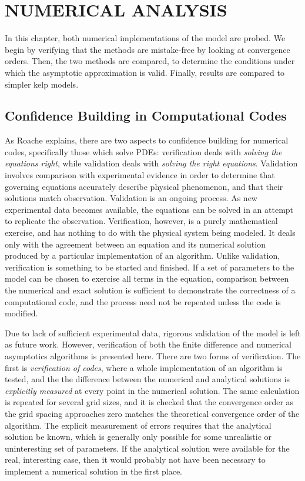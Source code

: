 \chapter{NUMERICAL ANALYSIS}
\label{chap:model_analysis}

In this chapter, both numerical implementations of the model are probed.
We begin by verifying that the methods are mistake-free by looking at convergence orders.
Then, the two methods are compared, to determine the conditions under which the asymptotic
approximation is valid.
Finally, results are compared to simpler kelp models.

\section{Confidence Building in Computational Codes}
As Roache explains, there are two aspects to confidence building for numerical codes, specifically those which solve PDEs:
verification deals with \textit{solving the equations right}, while validation deals with \textit{solving the right equations}.
Validation involves comparison with experimental evidence in order to determine that governing equations
accurately describe physical phenomenon, and that their solutions match observation.
Validation is an ongoing process.
As new experimental data becomes available, the equations can be solved in an attempt to replicate the observation.
Verification, however, is a purely mathematical exercise, and has nothing to do with the physical system being modeled.
It deals only with the agreement between an equation and its numerical solution produced by a particular implementation of an algorithm.
Unlike validation, verification is something to be started and finished.
If a set of parameters to the model can be chosen to exercise all terms in the equation, comparison between the numerical and exact solution is sufficient to demonstrate the correctness of a computational code, and the process need not be repeated unless the code is modified.

Due to lack of sufficient experimental data, rigorous validation of the model is left as future work.
However, verification of both the finite difference and numerical asymptotics algorithms is presented here.
There are two forms of verification.
The first is \textit{verification of codes}, where a whole implementation of an algorithm is tested, and the the difference between the numerical and analytical solutions is \textit{explicitly measured} at every point in the numerical solution.
The same calculation is repeated for several grid sizes, and it is checked that the convergence order as the grid spacing approaches zero matches the theoretical convergence order of the algorithm.
The explicit measurement of errors requires that the analytical solution be known, which is generally only possible for some unrealistic or uninteresting set of parameters.
If the analytical solution were available for the real, interesting case, then it would probably not have been necessary to implement a numerical solution in the first place.

